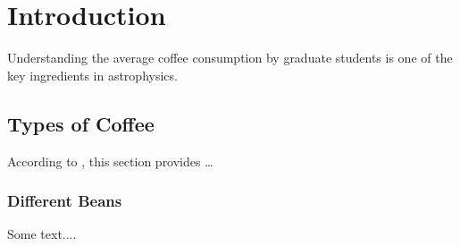 
\chapter{Introduction}
\label{chap:intro}

Understanding the average coffee consumption by graduate students is one of the
key ingredients in astrophysics.

\section{Types of Coffee}
\label{sec:intro_coffee}

According to \textcite{kww}, this section provides \ldots


\subsection{Different Beans}
\label{sec:intro_coffee_beans}

Some text....